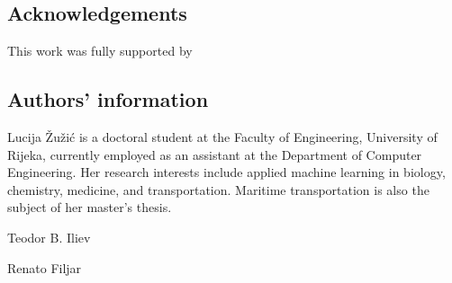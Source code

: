 \documentclass[sn-mathphys-num]{sn-jnl}%
\begin{document}
\subsection{Acknowledgements}

This work was fully supported by

\subsection{Authors' information}

Lucija Žužić is a doctoral student at the Faculty of Engineering, University of Rijeka, currently employed as an assistant at the Department of Computer Engineering. Her research interests include applied machine learning in biology, chemistry, medicine, and transportation. Maritime transportation is also the subject of her master's thesis.

Teodor B. Iliev

Renato Filjar

\end{document}
